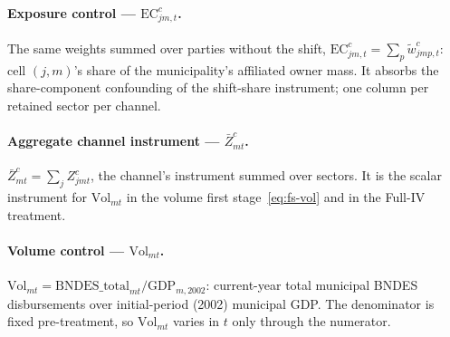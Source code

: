 \documentclass{article}
\newcommand{\EC}{\mathrm{EC}}
\newcommand{\Vol}{\mathrm{Vol}}
\newcommand{\Zbar}{\bar Z}
\begin{document}
\paragraph{Exposure control --- $\EC^{c}_{jm,t}$.}
The same weights summed over parties without the shift,
$\EC^{c}_{jm,t}=\sum_{p}\tilde w^{c}_{jmp,t}$: cell $(j,m)$'s share of the
municipality's affiliated owner mass. It absorbs the share-component
confounding of the shift-share instrument; one column per retained sector per
channel.

\paragraph{Aggregate channel instrument --- $\Zbar^{c}_{mt}$.}
$\Zbar^{c}_{mt}=\sum_j Z^{c}_{jmt}$, the channel's instrument summed over
sectors. It is the scalar instrument for $\Vol_{mt}$ in the volume first
stage~\eqref{eq:fs-vol} and in the Full-IV treatment.

\paragraph{Volume control --- $\Vol_{mt}$.}
$\Vol_{mt}=\mathrm{BNDES\_total}_{mt}/\mathrm{GDP}_{m,2002}$: current-year total
municipal BNDES disbursements over initial-period (2002) municipal GDP. The
denominator is fixed pre-treatment, so $\Vol_{mt}$ varies in $t$ only through
the numerator.
\end{document}
